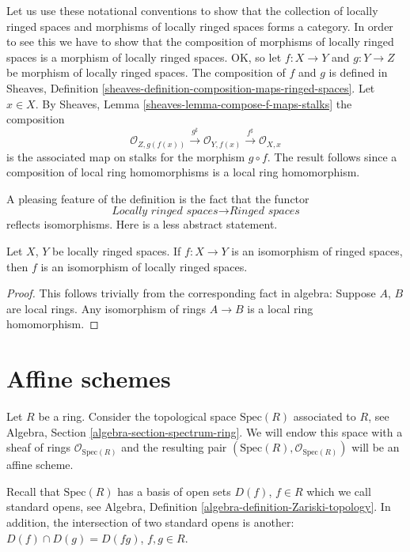 \medskip\noindent
Let us use these notational conventions to show that the
collection of locally ringed spaces and morphisms of locally
ringed spaces forms a category. In order to see this we have
to show that the composition of morphisms of locally ringed
spaces is a morphism of locally ringed spaces. OK, so let
$f : X \to Y$ and $g : Y \to Z$ be morphism of locally
ringed spaces. The composition of $f$ and $g$ is defined in
Sheaves, Definition \ref{sheaves-definition-composition-maps-ringed-spaces}.
Let $x \in X$. By
Sheaves, Lemma \ref{sheaves-lemma-compose-f-maps-stalks}
the composition
$$
\mathcal{O}_{Z, g(f(x))}
\xrightarrow{g^\sharp}
\mathcal{O}_{Y, f(x)}
\xrightarrow{f^\sharp}
\mathcal{O}_{X, x}
$$
is the associated map on stalks for the morphism $g \circ f$.
The result follows since a composition of local ring
homomorphisms is a local ring homomorphism.

\medskip\noindent
A pleasing feature of the definition is the fact that the functor
$$
\textit{Locally ringed spaces}
\longrightarrow
\textit{Ringed spaces}
$$
reflects isomorphisms. Here is a less abstract statement.

\begin{lemma}
\label{lemma-isomorphism-locally-ringed}
Let $X$, $Y$ be locally ringed spaces.
If $f : X \to Y$ is an isomorphism of
ringed spaces, then $f$ is an isomorphism
of locally ringed spaces.
\end{lemma}

\begin{proof}
This follows trivially from the corresponding fact in algebra:
Suppose $A$, $B$ are local rings. Any isomorphism of rings
$A \to B$ is a local ring homomorphism.
\end{proof}



\section{Affine schemes}
\label{section-affine-schemes}

\noindent
Let $R$ be a ring. Consider the topological space $\text{Spec}(R)$
associated to $R$, see Algebra, Section \ref{algebra-section-spectrum-ring}.
We will endow this space with a sheaf of rings $\mathcal{O}_{\text{Spec}(R)}$
and the resulting pair $(\text{Spec}(R), \mathcal{O}_{\text{Spec}(R)})$
will be an affine scheme.

\medskip\noindent
Recall that $\text{Spec}(R)$ has a basis of open sets $D(f)$,
$f \in R$ which we call standard opens, see Algebra,
Definition \ref{algebra-definition-Zariski-topology}.
In addition, the intersection of two standard opens is another:
$D(f) \cap D(g) = D(fg)$, $f,g\in R$.

